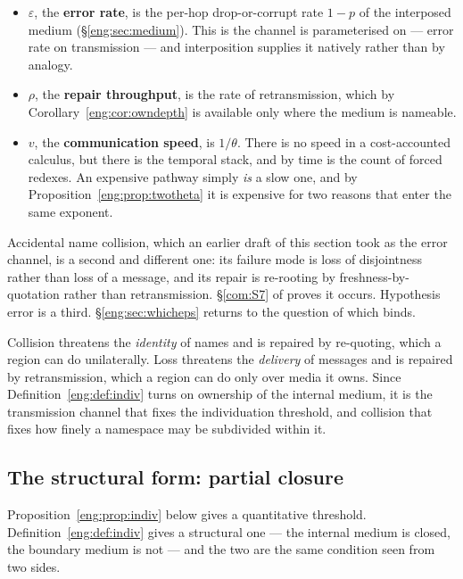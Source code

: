 \begin{itemize}[itemsep=3pt]
\item $\varepsilon$, the \textbf{error rate}, is the per-hop drop-or-corrupt
rate $1-p$ of the interposed medium (\S\ref{eng:sec:medium}). This is the
channel \cite{compaut} is parameterised on --- error rate on transmission
--- and interposition supplies it natively rather than by analogy.
\item $\rho$, the \textbf{repair throughput}, is the rate of
retransmission, which by Corollary~\ref{eng:cor:owndepth} is available only
where the medium is nameable.
\item $v$, the \textbf{communication speed}, is $1/\theta$. There is no
speed in a cost-accounted calculus, but there is the temporal stack, and by
\cite[Prop.~4.1]{CE} time is the count of forced redexes. An expensive
pathway simply \emph{is} a slow one, and by
Proposition~\ref{eng:prop:twotheta} it is expensive for two reasons that enter
the same exponent.
\end{itemize}

Accidental name collision, which an earlier draft of this section took as
the error channel, is a second and different one: its failure mode is loss
of disjointness rather than loss of a message, and its repair is re-rooting
by freshness-by-quotation rather than retransmission. \S\ref{com:S7} of \chComp
proves it occurs. Hypothesis error is a third. \S\ref{eng:sec:whicheps}
returns to the question of which binds.

\begin{remark}\label{eng:why-medium-channel-one}
Collision threatens the \emph{identity} of names and is repaired by
re-quoting, which a region can do unilaterally. Loss threatens the
\emph{delivery} of messages and is repaired by retransmission, which a
region can do only over media it owns. Since Definition~\ref{eng:def:indiv}
turns on ownership of the internal medium, it is the transmission channel
that fixes the individuation threshold, and collision that fixes how
finely a namespace may be subdivided within it.
\end{remark}

\subsection{The structural form: partial closure}\label{eng:S8.2}

Proposition~\ref{eng:prop:indiv} below gives a quantitative threshold.
Definition~\ref{eng:def:indiv} gives a structural one --- the internal medium
is closed, the boundary medium is not --- and the two are the same
condition seen from two sides.


